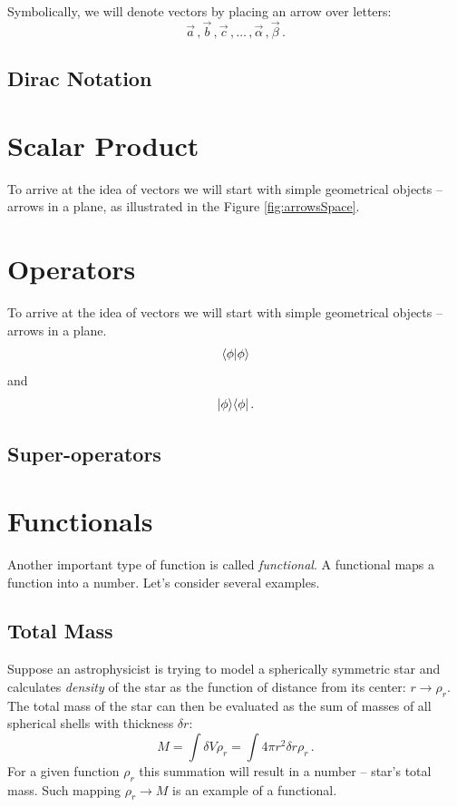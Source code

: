 Symbolically, we will denote vectors by placing an arrow over letters:
\[
\vec{a}\,,\vec{b}\,,\vec{c}\,,\ldots\,,\vec{\alpha}\,,\vec{\beta}\,.
\]

\subsection{Dirac Notation}

\section{Scalar Product}

To arrive at the idea of vectors we will start with simple geometrical
objects -- arrows in a plane, as illustrated in the Figure \ref{fig:arrowsSpace}.

\section{Operators}

To arrive at the idea of vectors we will start with simple geometrical
objects -- arrows in a plane.
\[
\langle{\phi}|{\phi\rangle}
\]
and
\[
|{\phi}\rangle\langle{\phi}|\,.
\]

\subsection{Super-operators}

\section{Functionals}
Another important type of function is called \emph{functional}. A functional maps a function into a number. Let's consider several examples.

\subsection*{Total Mass}
Suppose an astrophysicist is trying to model a spherically symmetric star and calculates \emph{density} of the star as the function of distance from its center: $r\rightarrow\rho_r$. The total mass of the star can then be evaluated as the sum of masses of all spherical shells with thickness $\delta r$:
\[
M = \int \delta V\rho_r=\int 4\pi r^2\delta r\rho_r\,.
\]
For a given function $\rho_r$ this summation will result in a number -- star's total mass. Such mapping $\rho_r\rightarrow M$ is an example of a functional.

